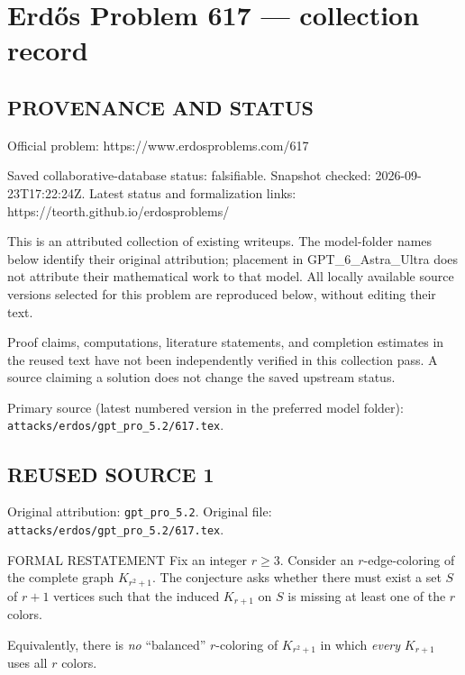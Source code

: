 \section*{Erd\H{o}s Problem 617 --- collection record}

\subsection*{PROVENANCE AND STATUS}
Official problem: https://www.erdosproblems.com/617

Saved collaborative-database status: falsifiable.
Snapshot checked: 2026-09-23T17:22:24Z.
Latest status and formalization links: https://teorth.github.io/erdosproblems/

This is an attributed collection of existing writeups. The model-folder names below identify their original attribution; placement in GPT\_6\_Astra\_Ultra does not attribute their mathematical work to that model. All locally available source versions selected for this problem are reproduced below, without editing their text.

Proof claims, computations, literature statements, and completion estimates in the reused text have not been independently verified in this collection pass. A source claiming a solution does not change the saved upstream status.

Primary source (latest numbered version in the preferred model folder): \texttt{attacks/erdos/gpt\_pro\_5.2/617.tex}.

\subsection*{REUSED SOURCE 1}
Original attribution: \texttt{gpt\_pro\_5.2}.
Original file: \texttt{attacks/erdos/gpt\_pro\_5.2/617.tex}.


FORMAL RESTATEMENT
Fix an integer $r\ge3$. Consider an $r$-edge-coloring of the complete graph
$K_{r^2+1}$.
The conjecture asks whether there must exist a set $S$ of $r+1$ vertices such
that the induced $K_{r+1}$ on $S$ is missing at least one of the $r$ colors.

Equivalently, there is \emph{no} ``balanced'' $r$-coloring of $K_{r^2+1}$ in which
\emph{every} $K_{r+1}$ uses all $r$ colors.

